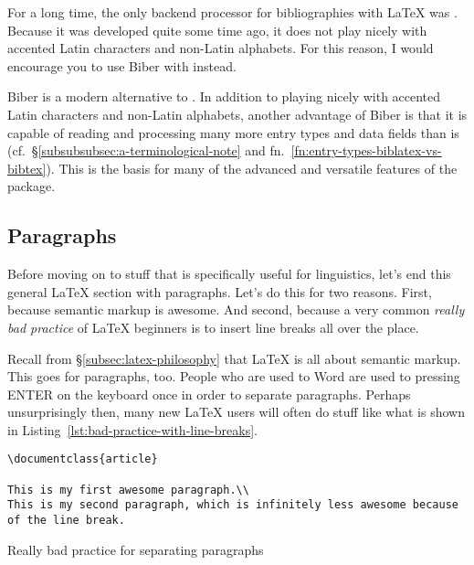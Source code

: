 For a long time, the only backend processor for bibliographies with \LaTeX{} was .
Because it was developed quite some time ago, it does not play nicely with accented Latin characters and non-Latin alphabets.
For this reason, I would encourage you to use Biber with  instead.

\label{subsubsubsec:biber}

Biber is a modern alternative to .
In addition to playing nicely with accented Latin characters and non-Latin alphabets, another advantage of Biber is that it is capable of reading and processing many more entry types and data fields than  is (cf.~\S\ref{subsubsubsec:a-terminological-note} and fn.~\ref{fn:entry-types-biblatex-vs-bibtex}).
This is the basis for many of the advanced and versatile features of the  package.

\subsection{Paragraphs}
\label{subsec:paragraphs}

Before moving on to stuff that is specifically useful for linguistics, let's end this general \LaTeX{} section with paragraphs.
Let's do this for two reasons.
First, because semantic markup is awesome.
And second, because a very common \emph{really bad practice} of \LaTeX{} beginners is to insert line breaks all over the place.

Recall from \S\ref{subsec:latex-philosophy} that \LaTeX{} is all about semantic markup.
This goes for paragraphs, too.
People who are used to Word are used to pressing ENTER on the keyboard once in order to separate paragraphs.
Perhaps unsurprisingly then, many new \LaTeX{} users will often do stuff like what is shown in Listing~\ref{lst:bad-practice-with-line-breaks}.

\begin{listing}[htbp]
	\centering
	\begin{verbatim}
\documentclass{article}

This is my first awesome paragraph.\\
This is my second paragraph, which is infinitely less awesome because of the line break.

	\end{verbatim}
	\caption{Really bad practice for separating paragraphs}
	\label{lst:bad-practice-with-line-breaks}
\end{listing}

